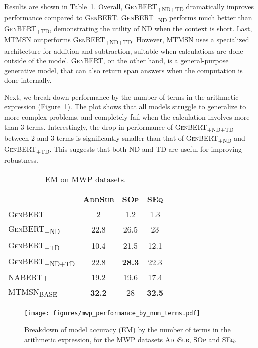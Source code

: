 \documentclass[11pt,a4paper]{article}
\newcommand\ssc[1]{\textsubscript{\textsc{#1}}}
\newcommand\genbert{\textsc{GenBERT}}
\newcommand\addsub{\textsc{AddSub}}
\newcommand\singleop{\textsc{SOp}}
\newcommand\singleeq{\textsc{SEq}}
\newcommand\nabert{\textsc{NABERT+}}
\newcommand\mtmsn{\textsc{MTMSN}}
\begin{document}
Results are shown in Table~\ref{table:mwp_performance}. 
Overall, \textsc{GenBERT\ssc{+ND+TD}} dramatically improves performance compared to \genbert{}. \textsc{GenBERT\ssc{+ND}} performs much better than \textsc{GenBERT\ssc{+TD}}, demonstrating the utility of ND when the context is short. Last, \mtmsn{} outperforms \textsc{GenBERT\ssc{+ND+TD}}. However, \mtmsn{} uses a specialized architecture for addition and subtraction, suitable when calculations are done outside of the model. \genbert{}, on the other hand, is a general-purpose generative model, that can also return span answers when the computation is done internally.



Next, we break down performance by the number of terms in the arithmetic expression (Figure~\ref{figure:mwp_performance_by_num_terms}). The plot shows that all models struggle to generalize to more complex problems, and completely fail when the calculation involves more than 3 terms.
Interestingly, the drop in performance of \textsc{GenBERT\ssc{+ND+TD}} between 2 and 3 terms is significantly smaller than that of \textsc{GenBERT\ssc{+ND}} and \textsc{GenBERT\ssc{+TD}}. This suggests that both ND and TD are useful for improving robustness.





\begin{table}[t]\setlength{\belowcaptionskip}{-10pt}
    \footnotesize
    \centering
    \begin{tabular}{l|c|c|c}
          & \addsub & \singleop & \singleeq \\ \hline
         \textsc{GenBERT} & 2 & 1.2 & 1.3 \\
         \textsc{GenBERT\ssc{+ND}} & 22.8 & 26.5 & 23 \\
         \textsc{GenBERT\ssc{+TD}} & 10.4 & 21.5 & 12.1 \\
         \textsc{GenBERT\ssc{+ND+TD}} & 22.8 & \bf 28.3 & 22.3 \\
\hline\hline
         \nabert & 19.2 & 19.6 & 17.4 \\
         \mtmsn \textsubscript{\textsc{BASE}} & \bf 32.2 & 28 & \bf 32.5 \\
    \end{tabular}
    \caption{EM on MWP datasets.}
    \label{table:mwp_performance}
\end{table}

\begin{figure}
\setlength{\abovecaptionskip}{-2pt}
    \centering
    \texttt{[image: figures/mwp\_performance\_by\_num\_terms.pdf]}
    \caption{Breakdown of model accuracy (EM) by the number of terms in the arithmetic expression, for the MWP datasets \addsub{}, \singleop{} and \singleeq{}.}
    \label{figure:mwp_performance_by_num_terms}
\end{figure}
\end{document}
